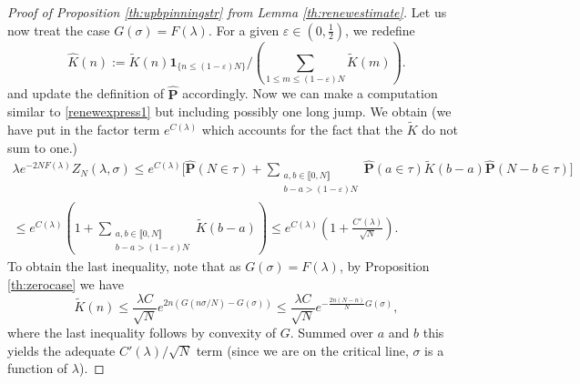 \documentclass[reqno,11pt]{amsart}
\numberwithin{equation}{section}
\newcommand{\gep}{\varepsilon}       %
\newcommand{\gl}{\lambda}
\newcommand{\gs}{\sigma}
\newcommand{\bP}{{\ensuremath{\mathbf P}} }
\newcommand{\ind}{\mathbf{1}}
\newcommand{\lint}{\llbracket}
\newcommand{\rint}{\rrbracket}
\renewcommand{\tilde}{\widetilde}
\renewcommand{\hat}{\widehat}
\newcommand{\sumtwo}[2]{\sum_{\substack{#1 \\ #2}}} %
\begin{document}
\begin{proof}[Proof of Proposition \ref{th:upbpinningstr} from Lemma \ref{th:renewestimate}]
Let us now treat the case $G(\sigma)= F(\lambda)$.  For a given $\gep \in (0, \frac{1}{2})$, we redefine
\begin{equation}\label{redefined}
 \hat K(n):= \tilde K(n)\ind_{\{ n \le (1-\gep )N\}}/ \left(\sum_{1 \le m \le (1-\gep )N} \tilde K(m)\right).
\end{equation}
and update the definition of $\hat \bP$ accordingly.
Now we can make a computation similar to \eqref{renewexpress1} but including possibly one long jump. 
We obtain (we have put in  the factor  term $e^{C(\gl)}$ which accounts for the fact that the $\tilde  K$ do not sum to one.)
\begin{multline}\label{renewexpress2}
  \gl e^{-2N F(\gl)} Z_N(\gl,\sigma)\le  e^{ C( \gl)} \bigg[ \hat \bP\left( N  \in \tau \right)+ \!\!\!\! \sumtwo{a,b\in \lint 0,N\rint}{ b-a > (1-\gep)N}  \!\!\!\!  \hat \bP\left( a  \in \tau\right)\tilde K(b-a)
  \hat \bP\left( N-b  \in \tau\right)\bigg]\\
  \le  e^{C( \gl)}\left(1+\sumtwo{a,b\in \lint 0,N\rint}{ b-a > (1-\gep)N}  \!\!\!\!  \tilde K(b-a)\right)\le e^{ C(\gl)}\left(1+ \frac{C'(\gl)}{\sqrt{N}}\right) .  
\end{multline}
To obtain the last inequality, note that as  $G(\sigma)=F(\gl)$, by Proposition \ref{th:zerocase} we have
 $$\tilde K(n)
 \le \frac{\gl  C}{\sqrt{N}}e^{ 2n\left(G(n\gs/N)-G(\gs)\right)}\le  \frac{\gl C}{\sqrt{N}}e^{- \frac{2n(N-n)}{N}G(\sigma)},$$ 
where the last inequality follows by convexity of $G$. Summed over $a$ and $b$ this yields the adequate $C'(\gl)/\sqrt{N}$ term (since we are on the critical line, $\sigma$ is a function of $\gl$).


\medskip 


\end{proof}
\end{document}
